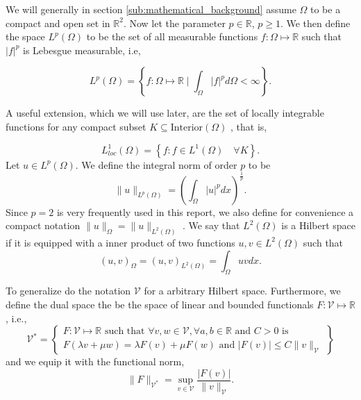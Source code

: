 We will generally in section \ref{sub:mathematical_background} assume $\Omega $ to be a compact and open set in $\mathbb{R} ^{2}$. Now let the parameter $p \in \mathbb{R} $, $p\ge 1$. We then define the space $L^{p}\left( \Omega  \right) $ to be the set of all measurable functions $f: \Omega  \mapsto \mathbb{R} $ such that
$\left\lvert f \right\rvert ^{p}$ is Lebesgue measurable, i.e,

\begin{equation*}
    L^{p}\left( \Omega  \right) = \left\{ f: \Omega \mapsto \mathbb{R}  \mid \int_{\Omega }^{} \left\lvert f \right\rvert ^{p} d \Omega  < \infty  \right\}
.\end{equation*}

A useful extension, which we will use later, are the set of locally integrable functions for any compact subset $K \subseteq \text{Interior}\left( \Omega  \right) $ \cite{brenner07math}, that is,

\begin{equation*}
    L_{loc}^{1}\left( \Omega  \right)  = \left\{ f: f \in L^{1}\left( \Omega  \right)  \quad \forall K  \right\}.
\end{equation*}
Let $u \in L^{p}\left( \Omega  \right) $. We define the integral norm of order $p$ to be \[
\| u \|_{ L^{p}\left( \Omega  \right)  }^{  }  = \left( \int_{\Omega }^{} \left\lvert u \right\rvert ^{p} dx  \right) ^{\frac{1}{p}}.
\]
Since $p=2$ is very frequently used in this report, we also define for convenience a compact notation $\| u \|_{ \Omega  }^{  }  = \| u \|_{ L^{2}\left( \Omega  \right)  }^{  } $ .  We say that $L^{2}\left( \Omega  \right) $ is a Hilbert space if it is equipped with a inner
product of two functions $u,v \in L^{2}\left( \Omega  \right) $ such that
\[
\left( u,v \right) _{\Omega } = \left( u,v \right) _{L^2\left( \Omega  \right) } = \int_{\Omega }^{} u  v dx.
\]

To generalize do the notation $\mathcal{V} $ for a arbitrary Hilbert space. Furthermore, we define the dual space the be the space of linear and bounded functionals $F: \mathcal{V}  \mapsto \mathbb{R} $\cite{quartdiff}, i.e., \[
\mathcal{V} ^{*} =
\left.
\begin{cases}
F: \mathcal{V}  \mapsto \mathbb{R} \text{ such that }\forall v,w \in \mathcal{V}, \forall a,b \in \mathbb{R} \text{ and } C> 0 \text{ is }   \\
  F\left( \lambda v + \mu w  \right) = \lambda F(v) + \mu F(w) \text{ and } \left\lvert F\left( v \right)  \right\rvert \le C \| v \|_{ \mathcal{V}  }^{  }
\end{cases}
  \right\}
\]
and we equip it with the functional norm,  \[
    \| F \|_{ \mathcal{V} ^{*} }^{  } = \sup_{v \in \mathcal{V}   } \frac{\left\lvert F\left( v \right)  \right\rvert }{\| v \|_{ \mathcal{V}  }^{  } }.
\]

